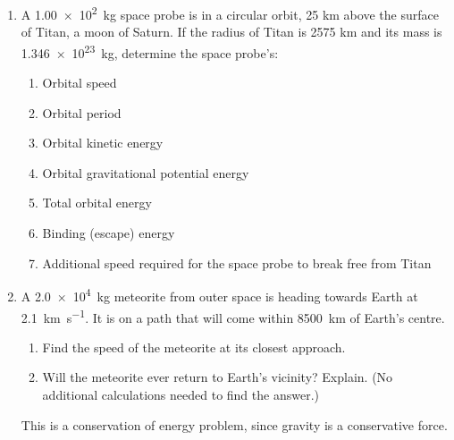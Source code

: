 \begin{enumerate}[itemsep=6pt]
\item A \SI{1.00e2}{\kilo\gram} space probe is in a circular orbit, 25 km
  above the surface of Titan, a moon of Saturn. If the radius of Titan is 2575
  km and its mass is \SI{1.346e23}{\kilo\gram}, determine the space probe's:
  \begin{enumerate}[itemsep=3pt]
  \item Orbital speed
  \item Orbital period
  \item Orbital kinetic energy
  \item Orbital gravitational potential energy
  \item Total orbital energy
  \item Binding (escape) energy
  \item Additional speed required for the space probe to break free from Titan
  \end{enumerate}

  
\item A \SI{2.0e4}{\kilo\gram} meteorite from outer space is heading towards
  Earth at \SI{2.1}{\kilo\metre\per\second}. It is on a path that will come
  within \SI{8500}{\kilo\metre} of Earth's centre.
  \begin{enumerate}[itemsep=3pt]
  \item Find the speed of the meteorite at its closest approach.
  \item Will the meteorite ever return to Earth's vicinity? Explain. (No
    additional calculations needed to find the answer.)
  \end{enumerate}
  This is a conservation of energy problem, since gravity is a conservative
  force.


\end{enumerate}
